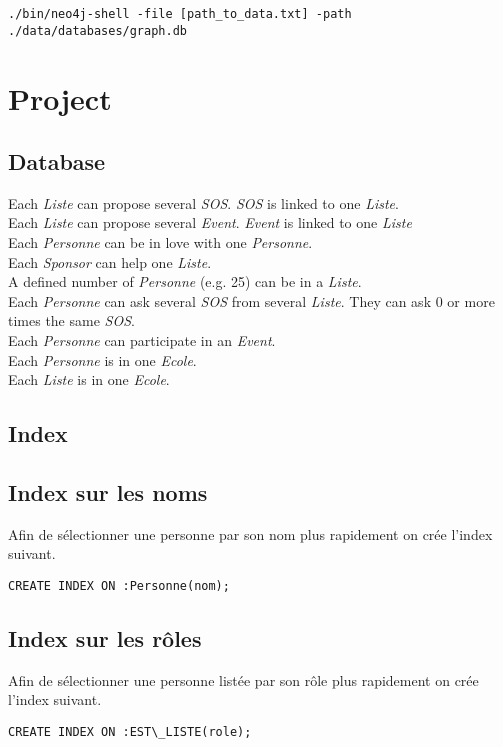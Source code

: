 \documentclass[a4paper,oneside,1pt]{article}
\begin{document}
\texttt{./bin/neo4j-shell -file [path\_to\_data.txt] -path ./data/databases/graph.db}

\section{Project}

\subsection{Database}


Each \textit{Liste} can propose several \textit{SOS}. \textit{SOS} is linked to one \textit{Liste}. \\
Each \textit{Liste} can propose several \textit{Event}. \textit{Event} is linked to one \textit{Liste} \\
Each \textit{Personne} can be in love with one \textit{Personne}. \\
Each \textit{Sponsor} can help one \textit{Liste}. \\
A defined number of \textit{Personne} (e.g. 25) can be in a \textit{Liste}. \\
Each \textit{Personne} can ask several \textit{SOS} from several \textit{Liste}. They can ask 0 or more times the same \textit{SOS}. \\
Each \textit{Personne} can participate in an \textit{Event}. \\
Each \textit{Personne} is in one \textit{Ecole}. \\
Each \textit{Liste} is in one \textit{Ecole}. \\
\subsection{Index}
\subsection{Index sur les noms}
Afin de sélectionner une personne par son nom plus rapidement on crée l'index suivant.
\\
\begin{verbatim}
CREATE INDEX ON :Personne(nom);
\end{verbatim}
\subsection{Index sur les rôles}
Afin de sélectionner une personne listée par son rôle plus rapidement on crée l'index suivant.
\\
\begin{verbatim}
CREATE INDEX ON :EST\_LISTE(role);
\end{verbatim}
\end{document}
